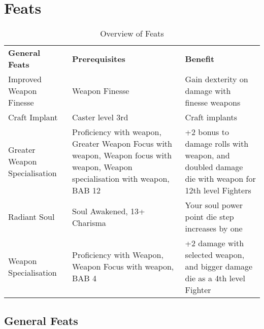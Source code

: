 \section{Feats}
\label{sec:Feats}

\begin{table*}[!htb]
  \small
  \caption{Overview of Feats}
  \begin{tabular}{l p{4.5cm} p{7cm}}
    \textbf{General Feats}        & \textbf{Prerequisites}           & \textbf{Benefit} \\
    Improved Weapon Finesse       & Weapon Finesse                   & Gain dexterity on damage with finesse weapons \\
    Craft Implant                 & Caster level 3rd                 & Craft implants \\
    Greater Weapon Specialisation & Proficiency with weapon, Greater Weapon Focus with weapon, Weapon focus with weapon, Weapon specialisation with weapon, BAB 12 & +2 bonus to damage rolls with weapon, and doubled damage die with weapon for 12th level Fighters \\
    Radiant Soul                  & Soul Awakened, 13+ Charisma      & Your soul power point die step increases by one \\
    Weapon Specialisation         & Proficiency with Weapon, Weapon Focus with weapon, BAB 4 & +2 damage with selected weapon, and bigger damage die as a 4th level Fighter \\
  \end{tabular}
\end{table*}

\subsection{General Feats}
\label{sec:General Feats}

